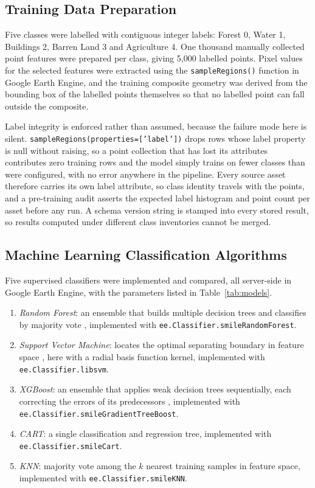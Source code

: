 \documentclass[conference]{IEEEtran}
\begin{document}
\subsection{Training Data Preparation}

Five classes were labelled with contiguous integer labels: Forest 0,
Water 1, Buildings 2, Barren Land 3 and Agriculture 4. One thousand
manually collected point features were prepared per class, giving 5{,}000
labelled points. Pixel values for the selected features were extracted
using the \texttt{sampleRegions()} function in Google Earth Engine, and
the training composite geometry was derived from the bounding box of the
labelled points themselves so that no labelled point can fall outside
the composite.

Label integrity is enforced rather than assumed, because the failure mode
here is silent. \texttt{sampleRegions(properties=['label'])} drops rows
whose label property is null without raising, so a point collection that
has lost its attributes contributes zero training rows and the model
simply trains on fewer classes than were configured, with no error
anywhere in the pipeline. Every source asset therefore carries its own
label attribute, so class identity travels with the points, and a
pre-training audit asserts the expected label histogram and point count
per asset before any run. A schema version string is stamped into every
stored result, so results computed under different class inventories
cannot be merged.

\subsection{Machine Learning Classification Algorithms}

Five supervised classifiers were implemented and compared, all
server-side in Google Earth Engine, with the parameters listed in
Table~\ref{tab:models}.

\begin{enumerate}
\item \textit{Random Forest}: an ensemble that builds multiple decision
trees and classifies by majority vote \cite{ref15}, implemented with
\texttt{ee.Classifier.smileRandomForest}.
\item \textit{Support Vector Machine}: locates the optimal separating
boundary in feature space \cite{ref16}, here with a radial basis
function kernel, implemented with \texttt{ee.Classifier.libsvm}.
\item \textit{XGBoost}: an ensemble that applies weak decision trees
sequentially, each correcting the errors of its predecessors
\cite{ref17}, implemented with
\texttt{ee.Classifier.smileGradientTreeBoost}.
\item \textit{CART}: a single classification and regression tree,
implemented with \texttt{ee.Classifier.smileCart}.
\item \textit{KNN}: majority vote among the $k$ nearest training samples
in feature space, implemented with \texttt{ee.Classifier.smileKNN}.
\end{enumerate}
\end{document}

